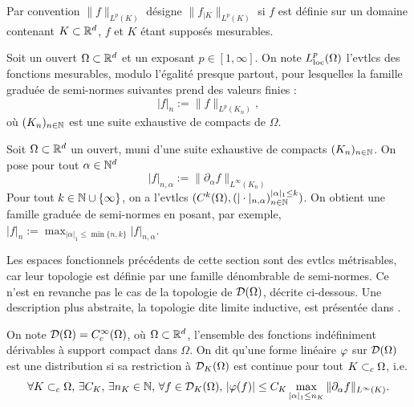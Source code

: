 Par convention $\|f\|_{L^p(K)}$ désigne $\|f_{|K}\|_{L^p(K)}$ si $f$ est définie sur un domaine contenant $K \subset \mathbb{R}^d$, $f$ et $K$ étant supposés mesurables. 

\begin{definition}
\label{def:lploc}
%
Soit un ouvert $\Omega\subset \mathbb{R}^d$ et un exposant $p\in [1,\infty]$. 
On note $L^p_{\mathrm{loc}}(\Omega)$ l'evtlcs des fonctions mesurables, modulo l'égalité presque partout, pour lesquelles la famille graduée de semi-normes suivantes prend des valeurs finies :
\begin{equation*}
	|f|_n := \|f\|_{L^p(K_n)},
\end{equation*}
où $(K_n)_{n \in \mathbb{N}}$ est une suite exhaustive de compacts de $\Omega$. 
\end{definition}

\begin{definition}	
\label{def:cont_nonbornee}
%
	Soit $\Omega \subset \mathbb{R}^d$ un ouvert, muni d'une suite exhaustive de compacts $(K_n)_{n \in \mathbb{N}}$. On pose pour tout $\alpha \in \mathbb{N}^d$
	\begin{equation*}
		|f|_{n,\alpha} := \|\partial_\alpha f\|_{L^\infty(K_n)} %
	\end{equation*}
	Pour tout $k \in \mathbb{N} \cup \{\infty\}$, on a l'evtlcs $(C^k(\Omega), (|\cdot|_{n,\alpha})_{n \in \mathbb{N}}^{|\alpha|_1\leq k})$. On obtient une famille graduée de semi-normes en posant, par exemple, $|f|_n := \max_{|\alpha|_1 \leq \min\{n,k\}} |f|_{n,\alpha}$.
\end{definition}

Les espaces fonctionnels précédents de cette section sont des evtlcs métrisables, car leur topologie est définie par une famille dénombrable de semi-normes. 
Ce n'est en revanche pas le cas de la topologie de $\mathcal{D}(\Omega)$, décrite ci-dessous.
Une description plus abstraite, la topologie dite limite inductive, est présentée dans \cite{carlier2009analyse}.


\begin{definition}
\label{def:distribution}
%
	On note $\mathcal{D}(\Omega) = C^\infty_c(\Omega)$, où $\Omega \subset \mathbb{R}^d$, l'ensemble des fonctions indéfiniment dérivables à support compact dans $\Omega$. 
	On dit qu'une forme linéaire $\varphi$ sur $\mathcal{D}(\Omega)$ est une distribution si sa restriction à $\mathcal{D}_K(\Omega)$ est continue pour tout $K \subset_c \Omega$, i.e. 
	\begin{equation}
	\label{eq:distrib_cont_loc}
		\forall K \subset_c \Omega,\, \exists C_K,\, \exists n_K \in \mathbb{N},\, 
		\forall f \in \mathcal{D}_K(\Omega),\, |\varphi(f)| \leq C_K \max_{|\alpha|_1 \leq n_K} \|\partial_\alpha f\|_{L^\infty(K)}.
	\end{equation}
\end{definition}

